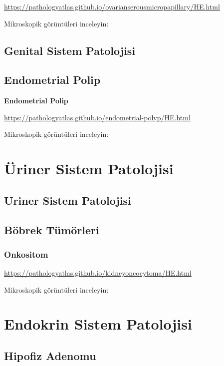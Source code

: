 \documentclass[
  letterpaper,
  DIV=11,
  numbers=noendperiod]{scrreprt}
\begin{document}
\url{https://pathologyatlas.github.io/ovarianserousmicropapillary/HE.html}

Mikroskopik görüntüleri inceleyin:

\hypertarget{genital-sistem-patolojisi}{%
\chapter{Genital Sistem Patolojisi}\label{genital-sistem-patolojisi}}

\hypertarget{endometrial-polip}{%
\chapter{Endometrial Polip}\label{endometrial-polip}}

\textbf{Endometrial Polip}

\url{https://pathologyatlas.github.io/endometrial-polyp/HE.html}

Mikroskopik görüntüleri inceleyin:

\part{Üriner Sistem Patolojisi}

\hypertarget{uriner-sistem-patolojisi}{%
\chapter{Uriner Sistem Patolojisi}\label{uriner-sistem-patolojisi}}

\hypertarget{buxf6brek-tuxfcmuxf6rleri}{%
\chapter{Böbrek Tümörleri}\label{buxf6brek-tuxfcmuxf6rleri}}

\hypertarget{onkositom}{%
\section{Onkositom}\label{onkositom}}

\url{https://pathologyatlas.github.io/kidneyoncocytoma/HE.html}

Mikroskopik görüntüleri inceleyin:

\part{Endokrin Sistem Patolojisi}

\hypertarget{hipofiz-adenomu}{%
\chapter{Hipofiz Adenomu}\label{hipofiz-adenomu}}
\end{document}
